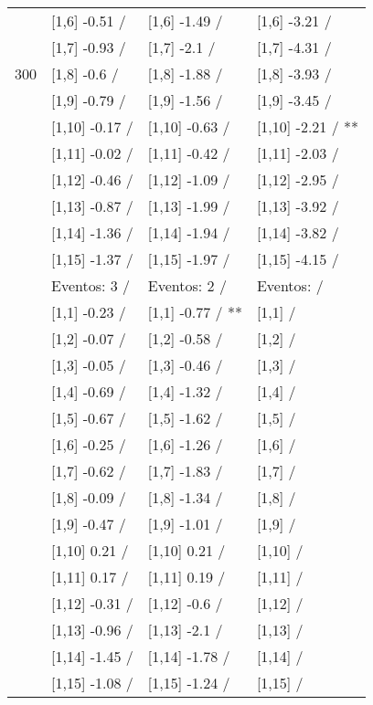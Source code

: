 \begin{table}
\begin{tabular}[t]{llll}
 & {}[1,6] -0.51  / & {}[1,6] -1.49  / & {}[1,6] -3.21  /\\
 & {}[1,7] -0.93  / & {}[1,7] -2.1  / & {}[1,7] -4.31  /\\
300 & {}[1,8] -0.6  / & {}[1,8] -1.88  / & {}[1,8] -3.93  /\\
\addlinespace
 & {}[1,9] -0.79  / & {}[1,9] -1.56  / & {}[1,9] -3.45  /\\
 & {}[1,10] -0.17  / & {}[1,10] -0.63  / & {}[1,10] -2.21  / **\\
 & {}[1,11] -0.02  / & {}[1,11] -0.42  / & {}[1,11] -2.03  /\\
 & {}[1,12] -0.46  / & {}[1,12] -1.09  / & {}[1,12] -2.95  /\\
 & {}[1,13] -0.87  / & {}[1,13] -1.99  / & {}[1,13] -3.92  /\\
\addlinespace
 & {}[1,14] -1.36  / & {}[1,14] -1.94  / & {}[1,14] -3.82  /\\
 & {}[1,15] -1.37  / & {}[1,15] -1.97  / & {}[1,15] -4.15  /\\
 & Eventos:  3 / & Eventos:  2 / & Eventos:   /\\
 & {}[1,1] -0.23  / & {}[1,1] -0.77  / ** & {}[1,1]  /\\
 & {}[1,2] -0.07  / & {}[1,2] -0.58  / & {}[1,2]  /\\
\addlinespace
 & {}[1,3] -0.05  / & {}[1,3] -0.46  / & {}[1,3]  /\\
 & {}[1,4] -0.69  / & {}[1,4] -1.32  / & {}[1,4]  /\\
 & {}[1,5] -0.67  / & {}[1,5] -1.62  / & {}[1,5]  /\\
 & {}[1,6] -0.25  / & {}[1,6] -1.26  / & {}[1,6]  /\\
 & {}[1,7] -0.62  / & {}[1,7] -1.83  / & {}[1,7]  /\\
\addlinespace
500 & {}[1,8] -0.09  / & {}[1,8] -1.34  / & {}[1,8]  /\\
 & {}[1,9] -0.47  / & {}[1,9] -1.01  / & {}[1,9]  /\\
 & {}[1,10] 0.21  / & {}[1,10] 0.21  / & {}[1,10]  /\\
 & {}[1,11] 0.17  / & {}[1,11] 0.19  / & {}[1,11]  /\\
 & {}[1,12] -0.31  / & {}[1,12] -0.6  / & {}[1,12]  /\\
\addlinespace
 & {}[1,13] -0.96  / & {}[1,13] -2.1  / & {}[1,13]  /\\
 & {}[1,14] -1.45  / & {}[1,14] -1.78  / & {}[1,14]  /\\
 & {}[1,15] -1.08  / & {}[1,15] -1.24  / & {}[1,15]  /\\
\bottomrule
\end{tabular}
\end{table}
